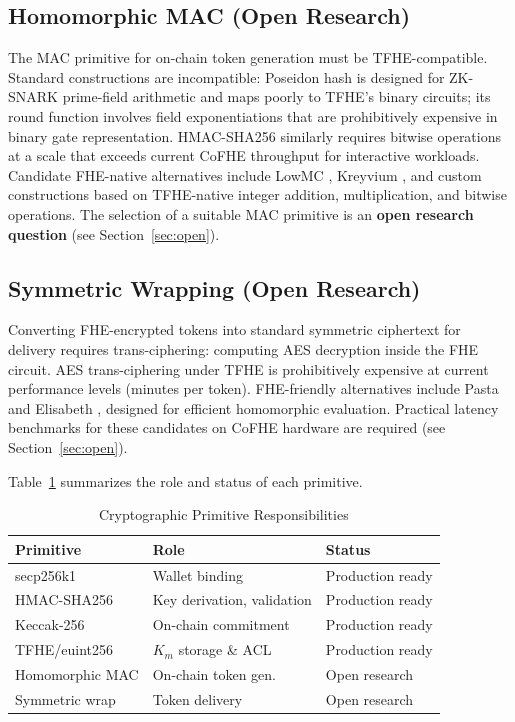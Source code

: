 \documentclass[conference]{IEEEtran}
\begin{document}
\subsection{Homomorphic MAC (Open Research)}
The MAC primitive for on-chain token generation must be TFHE-compatible. Standard
constructions are incompatible: Poseidon hash is designed for ZK-SNARK prime-field
arithmetic and maps poorly to TFHE's binary circuits; its round function involves
field exponentiations that are prohibitively expensive in binary gate representation.
HMAC-SHA256 similarly requires bitwise operations at a scale that exceeds current
CoFHE throughput for interactive workloads. Candidate FHE-native alternatives include
LowMC \cite{lowmc}, Kreyvium \cite{kreyvium}, and custom constructions based on
TFHE-native integer addition, multiplication, and bitwise operations. The selection
of a suitable MAC primitive is an \textbf{open research question} (see Section~\ref{sec:open}).

\subsection{Symmetric Wrapping (Open Research)}
Converting FHE-encrypted tokens into standard symmetric ciphertext for delivery requires
trans-ciphering: computing AES decryption inside the FHE circuit. AES trans-ciphering
under TFHE is prohibitively expensive at current performance levels (minutes per token).
FHE-friendly alternatives include Pasta \cite{pasta} and Elisabeth \cite{elisabeth},
designed for efficient homomorphic evaluation. Practical latency benchmarks for these
candidates on CoFHE hardware are required (see Section~\ref{sec:open}).

Table~\ref{tab:primitives} summarizes the role and status of each primitive.

\begin{table}[h]
\caption{Cryptographic Primitive Responsibilities}
\label{tab:primitives}
\renewcommand{\arraystretch}{1.2}
\begin{tabular}{p{1.8cm}p{2.0cm}p{2.2cm}}
\toprule
\textbf{Primitive} & \textbf{Role} & \textbf{Status} \\
\midrule
secp256k1 & Wallet binding & Production ready \\
HMAC-SHA256 & Key derivation, validation & Production ready \\
Keccak-256 & On-chain commitment & Production ready \\
TFHE/euint256 & $K_m$ storage \& ACL & Production ready \\
Homomorphic MAC & On-chain token gen. & Open research \\
Symmetric wrap & Token delivery & Open research \\
\bottomrule
\end{tabular}
\end{table}
\end{document}
